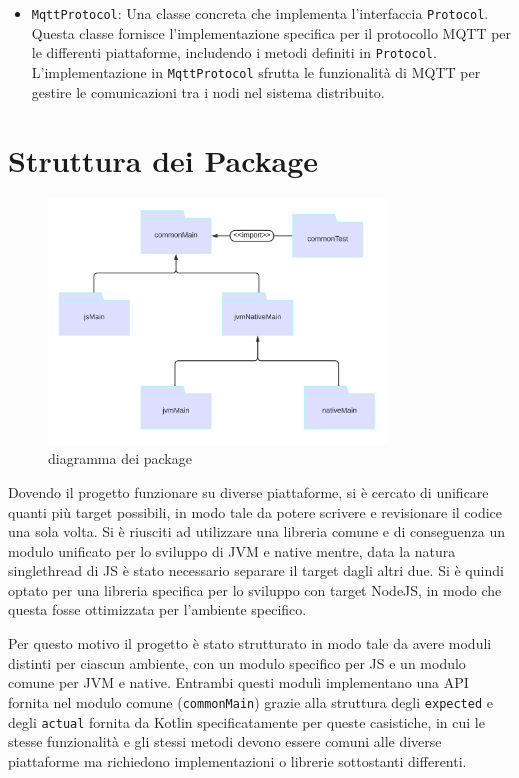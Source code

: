 \documentclass[12pt,a4paper,openright,twoside]{book}
\begin{document}
\begin{itemize}
    \item \texttt{MqttProtocol}: Una classe concreta che implementa l'interfaccia \texttt{Protocol}. Questa classe fornisce l'implementazione 
    specifica per il protocollo \ac{MQTT} per le differenti piattaforme, includendo i metodi definiti in \texttt{Protocol}.
    L'implementazione in \texttt{MqttProtocol} sfrutta le funzionalità di \ac{MQTT} per gestire le comunicazioni tra i nodi nel sistema distribuito.

\end{itemize}

\section{Struttura dei Package}
\begin{figure}[H]
    \centering
    \includegraphics[width=0.8\textwidth]{figures/package-diagram.png}
    \caption{diagramma dei package}
    \label{fig:diagramma-package}
\end{figure}

Dovendo il progetto funzionare su diverse piattaforme, si è cercato di unificare quanti più target possibili, in modo tale da potere scrivere e revisionare il codice una sola volta.
Si è riusciti ad utilizzare una libreria comune e di conseguenza un modulo unificato per lo sviluppo di \ac{JVM} e native 
mentre, data la natura singlethread di \ac{JS} è stato necessario separare il target dagli altri due. Si è quindi optato per una libreria specifica 
per lo sviluppo con target NodeJS, in modo che questa fosse ottimizzata per l'ambiente specifico. 

Per questo motivo il progetto è stato strutturato in modo tale da avere moduli distinti per ciascun ambiente, con un modulo specifico per \ac{JS} 
e un modulo comune per \ac{JVM} e native. Entrambi questi moduli implementano una API fornita nel modulo comune (\texttt{commonMain}) grazie
alla struttura degli \texttt{expected} e degli \texttt{actual} fornita da Kotlin specificatamente per queste casistiche, in cui le stesse funzionalità
e gli stessi metodi devono essere comuni alle diverse piattaforme ma richiedono implementazioni o librerie sottostanti differenti.
\end{document}
